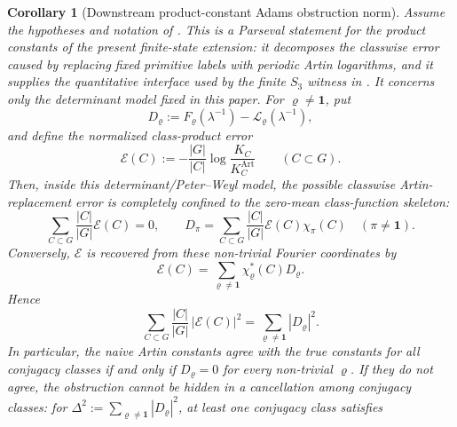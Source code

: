 \documentclass[11pt,a4paper]{amsart}
\theoremstyle{plain}
\newtheorem{corollary}[theorem]{Corollary}
\theoremstyle{definition}
\theoremstyle{remark}
\begin{document}
\begin{corollary}[Downstream product-constant Adams obstruction norm]
  \label{thm:adams-obstruction-bound}
  \label{cor:adams-obstruction-bound}
  \label{thm:adams-obstruction-budget}
  \label{cor:adams-obstruction-budget}
  Assume the hypotheses and notation of
  .  This is a Parseval statement for
  the product constants of the present finite-state extension: it decomposes
  the classwise error caused by replacing fixed primitive labels with
  periodic Artin logarithms, and it supplies the quantitative interface used
  by the finite \(S_3\) witness in
  .
  It concerns only the determinant model fixed in this paper.  For
  \(\varrho\neq\mathbf1\), put
  \[
    D_\varrho
    :=F_\varrho(\lambda^{-1})-\mathcal L_\varrho(\lambda^{-1}),
  \]
  and define the normalized class-product error
  \[
    \mathcal E(C)
    :=-
      \frac{|G|}{|C|}
      \log\frac{K_C}{K_C^{\mathrm{Art}}}
      \qquad(C\subset G).
  \]
  Then, inside this determinant/Peter--Weyl model, the possible classwise
  Artin-replacement error is completely confined to the zero-mean
  class-function skeleton:
  \begin{equation}\label{eq:adams-obstruction-bound-zero-mean}
    \sum_{C\subset G}\frac{|C|}{|G|}\mathcal E(C)=0,
    \qquad
    D_\pi=
    \sum_{C\subset G}\frac{|C|}{|G|}\mathcal E(C)\chi_\pi(C)
    \quad(\pi\neq\mathbf1).
  \end{equation}
  Conversely, \(\mathcal E\) is recovered from these non-trivial Fourier
  coordinates by
  \begin{equation}\label{eq:adams-obstruction-bound-forward}
    \mathcal E(C)=
    \sum_{\varrho\neq\mathbf1}\chi_\varrho^\ast(C)D_\varrho .
  \end{equation}
  Hence
  \begin{equation}\label{eq:adams-obstruction-bound-parseval}
    \sum_{C\subset G}\frac{|C|}{|G|}\,|\mathcal E(C)|^2
    =
    \sum_{\varrho\neq\mathbf1}|D_\varrho|^2.
  \end{equation}
  In particular, the naive Artin constants agree with the true constants for
  all conjugacy classes if and only if \(D_\varrho=0\) for every non-trivial
  \(\varrho\).  If they do not agree, the obstruction cannot be hidden in a
  cancellation among conjugacy classes: for
  \(\Delta^2:=\sum_{\varrho\neq\mathbf1}|D_\varrho|^2\), at least one
  conjugacy class satisfies

\end{corollary}
\end{document}
